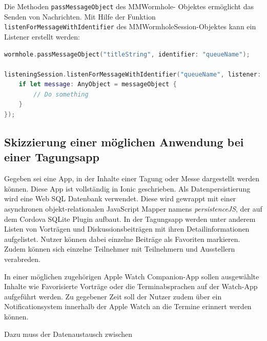 Die Methoden \texttt{passMessageObject} des MMWormhole- Objektes ermöglicht das Senden von Nachrichten. Mit Hilfe der Funktion \texttt{listenForMessageWithIdentifier} des MMWormholeSession-Objektes kann ein Listener erstellt werden:
\begin{lstlisting}[language=swift, breaklines=true]
wormhole.passMessageObject("titleString", identifier: "queueName");

listeningSession.listenForMessageWithIdentifier("queueName", listener: { (messageObject) -> Void in
    if let message: AnyObject = messageObject {
        // Do something
    }
});
\end{lstlisting}
%
%
\subsection{Skizzierung einer möglichen Anwendung bei einer Tagungsapp}
%
Gegeben sei eine App, in der Inhalte einer Tagung oder Messe dargestellt werden können. Diese App ist vollständig in Ionic geschrieben. Als Datenpersistierung wird eine Web SQL Datenbank verwendet. Diese wird gewrappt mit einer asynchronen objekt-relationalen JavaScript Mapper namens \emph{persistenceJS}, der auf dem Cordova SQLite Plugin aufbaut. In der Tagungsapp werden unter anderem Listen von Vorträgen und Diskussionsbeiträgen mit ihren Detailinformationen aufgelistet. Nutzer können dabei einzelne Beiträge als Favoriten markieren. Zudem können sich einzelne Teilnehmer mit Teilnehmern und Ausstellern verabreden.

In einer möglichen zugehörigen Apple Watch Companion-App sollen ausgewählte Inhalte wie Favorisierte Vorträge oder die Terminabsprachen auf der Watch-App aufgeführt werden. Zu gegebener Zeit soll der Nutzer zudem über ein Notificationsystem innerhalb der Apple Watch an die Termine erinnert werden können.

Dazu muss der Datenaustausch zwischen 